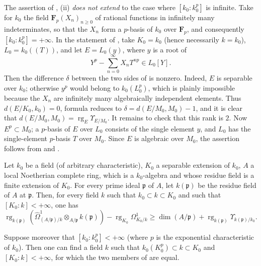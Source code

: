\begin{remark}[21.9.7]
\label{0.21.9.7}
The assertion of , (ii) \emph{does not extend} to the case where $[k_0:k_0^p]$ is infinite.
Take for $k_0$ the field $\mathbf{F}_p(X_n)_{n\geqslant0}$ of rational functions in infinitely many indeterminates, so that the $X_n$ form a $p$-basis of $k_0$ over $\mathbf{F}_p$, and consequently $[k_0:k_0^p]=+\infty$.
In the statement of , take $K_0=k_0$ (hence necessarily $k=k_0$), $L_0=k_0((T))$, and let $E=L_0(y)$, where $y$ is a root of
\[
  Y^p-\sum_{n=0}^{\infty}X_nT^{np}\in L_0[Y].
\]
Then the difference $\delta$ between the two sides of  is nonzero.
Indeed, $E$ is separable over $k_0$; otherwise $y^p$ would belong to $k_0(L_0^p)$, which is plainly impossible because the $X_n$ are infinitely many algebraically independent elements.
Thus $d(E/K_0,k_0)=0$, formula  reduces to $\delta=d(E/M_0,M_0)-1$, and it is clear that $d(E/M_0,M_0)=\operatorname{rg}_E\Upsilon_{E/M_0}$.
It remains to check that this rank is $2$.
Now $E^p\subset M_0$; a $p$-basis of $E$ over $L_0$ consists of the single element $y$, and $L_0$ has the single-element $p$-basis $T$ over $M_0$.
Since $E$ is algebraic over $M_0$, the assertion follows from  and .
\end{remark}

\begin{proposition}[21.9.8]
\label{0.21.9.8}
Let $k_0$ be a field \textup{(}of arbitrary characteristic\textup{)}, $K_0$ a separable extension of $k_0$, $A$ a local Noetherian complete ring, which is a $k_0$-algebra and whose residue field is a finite extension of $K_0$.
For every prime ideal $\mathfrak{p}$ of $A$, let $k(\mathfrak{p})$ be the residue field of $A$ at $\mathfrak{p}$.
Then, for every field $k$ such that $k_0\subset k\subset K_0$ and such that $[K_0:k]<+\infty$, one has
\begin{equation}
\tag{21.9.8.1}
  \label{0.21.9.8.1}
  \operatorname{rg}_{k(\mathfrak{p})}(\widehat{\Omega}^1_{(A/\mathfrak{p})/k}\otimes_{A/\mathfrak{p}} k(\mathfrak{p}))-\operatorname{rg}_{K_0}\Omega^1_{K_0/k}\geqslant\dim(A/\mathfrak{p})+\operatorname{rg}_{k(\mathfrak{p})}\Upsilon_{k(\mathfrak{p})/k_0}.
\end{equation}

Suppose moreover that $[k_0:k_0^p]<+\infty$ \textup{(}where $p$ is the exponential characteristic of $k_0$\textup{)}.
Then one can find a field $k$ such that $k_0(K_0^p)\subset k\subset K_0$ and $[K_0:k]<+\infty$, for which the two members of  are equal.
\end{proposition}

